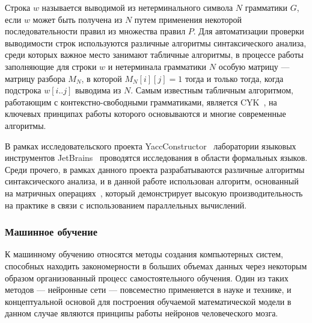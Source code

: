 Строка $w$ называется выводимой из нетерминального символа $N$ грамматики $G$, если $w$ может быть получена из $N$ путем применения некоторой последовательности правил из множества правил $P$. Для автоматизации проверки выводимости строк используются различные алгоритмы синтаксического анализа, среди которых важное место занимают табличные алгоритмы, в процессе работы заполняющие для строки $w$ и нетерминала грамматики $N$ особую матрицу --- матрицу разбора $M_N$, в которой $M_N[i][j] = 1$ тогда и только тогда, когда подстрока $w[i..j]$ выводима из $N$. Самым известным табличным алгоритмом, работающим с контекстно-свободными грамматиками, является CYK~\cite{cocke1969programming,younger1967recognition,kasami1966efficient}, на ключевых принципах работы которого основываются и многие современные алгоритмы.

В рамках исследовательского проекта YaccConstructor~\cite{yacc} лаборатории языковых
инструментов JetBrains~\cite{jetbrains} проводятся исследования в области формальных языков. Среди прочего, в рамках данного проекта разрабатываются различные алгоритмы синтаксического анализа, и в данной работе использован алгоритм, основанный на матричных операциях~\cite{azimov2018context}, который демонстрирует высокую производительность на практике в связи с использованием параллельных вычислений.

\subsubsection{Машинное обучение}
К машинному обучению относятся методы создания компьютерных систем, способных находить закономерности в больших объемах данных через некоторым образом организованный процесс самостоятельного обучения. Один из таких методов --- нейронные сети --- повсеместно применяется в науке и технике, и концептуальной основой для построения обучаемой математической модели в данном случае являются принципы работы нейронов человеческого мозга.

